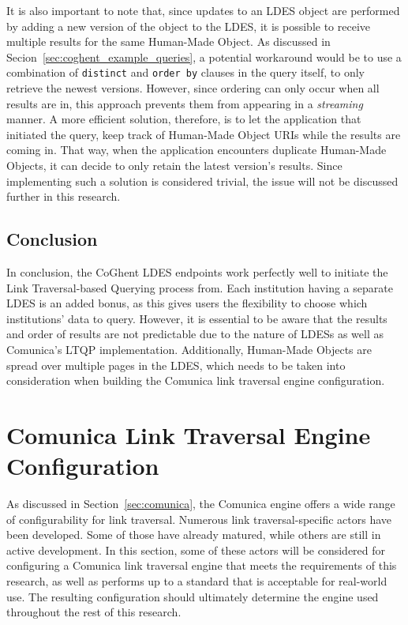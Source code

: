 It is also important to note that, since updates to an LDES object are performed by adding a new version of the object to the LDES, it is possible to receive multiple results for the same Human-Made Object. As discussed in Secion~\ref{sec:coghent_example_queries}, a potential workaround would be to use a combination of \texttt{distinct} and \texttt{order by} clauses in the query itself, to only retrieve the newest versions. However, since ordering can only occur when all results are in, this approach prevents them from appearing in a \textit{streaming} manner. A more efficient solution, therefore, is to let the application that initiated the query, keep track of Human-Made Object URIs while the results are coming in. That way, when the application encounters duplicate Human-Made Objects, it can decide to only retain the latest version's results. Since implementing such a solution is considered trivial, the issue will not be discussed further in this research.

\subsection{Conclusion}

In conclusion, the CoGhent LDES endpoints work perfectly well to initiate the Link Traversal-based Querying process from. Each institution having a separate LDES is an added bonus, as this gives users the flexibility to choose which institutions' data to query. However, it is essential to be aware that the results and order of results are not predictable due to the nature of LDESs as well as Comunica's LTQP implementation. Additionally, Human-Made Objects are spread over multiple pages in the LDES, which needs to be taken into consideration when building the Comunica link traversal engine configuration.

\section{Comunica Link Traversal Engine Configuration}
\label{sec:comunica_link_traversal_engine_configuration}

As discussed in Section~\ref{sec:comunica}, the Comunica engine offers a wide range of configurability for link traversal. Numerous link traversal-specific actors have been developed. Some of those have already matured, while others are still in active development. In this section, some of these actors will be considered for configuring a Comunica link traversal engine that meets the requirements of this research, as well as performs up to a standard that is acceptable for real-world use. The resulting configuration should ultimately determine the engine used throughout the rest of this research.

